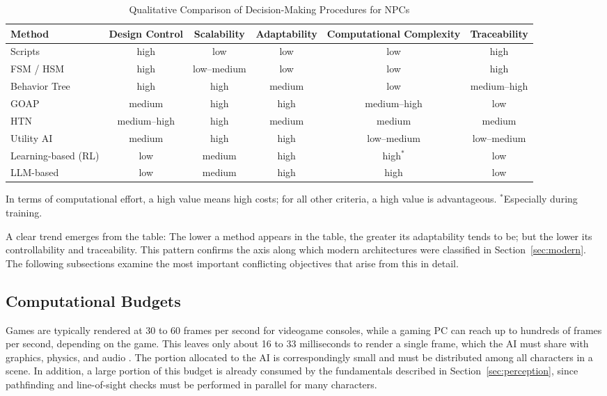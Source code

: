 \begin{table}[!t]
\renewcommand{\arraystretch}{1.2}
\caption{Qualitative Comparison of Decision-Making Procedures for NPCs}
\label{tab:comparison}
\centering
\begin{tabular}{lccccc}
\hline
\textbf{Method} & \textbf{Design Control} & \textbf{Scalability} & \textbf{Adaptability} & \textbf{Computational Complexity} & \textbf{Traceability} \\
\hline
Scripts          & high         & low         & low & low         & high \\
FSM / HSM        & high         & low–medium & low & low         & high \\
Behavior Tree    & high         & high           & medium & low         & medium–high \\
GOAP             & medium       & high           & high   & medium–high   & low \\
HTN              & medium–high & high           & medium & medium         & medium \\
Utility AI       & medium       & high           & high   & low–medium & low–medium \\
Learning-based (RL) & low       & medium         & high   & high$^{\ast}$  & low \\
LLM-based      & low       & medium         & high   & high           & low \\
\hline
\end{tabular}

\vspace{2pt}
{\footnotesize In terms of computational effort, a high value means high costs; for all other criteria, a high value is advantageous. $^{\ast}$Especially during training.}
\end{table}

A clear trend emerges from the table: The lower a method appears in the table, the greater its adaptability tends to be; but the lower its controllability and traceability. This pattern confirms the axis along which modern architectures were classified in Section~\ref{sec:modern}. The following subsections examine the most important conflicting objectives that arise from this in detail.

\subsection{Computational Budgets}

Games are typically rendered at 30 to 60 frames per second for videogame consoles, while a gaming PC can reach up to hundreds of frames per second, depending on the game. This leaves only about 16 to 33 milliseconds to render a single frame, which the AI must share with graphics, physics, and audio \cite{nareyek2004}. The portion allocated to the AI is correspondingly small and must be distributed among all characters in a scene. In addition, a large portion of this budget is already consumed by the fundamentals described in Section~\ref{sec:perception}, since pathfinding and line-of-sight checks must be performed in parallel for many characters.

